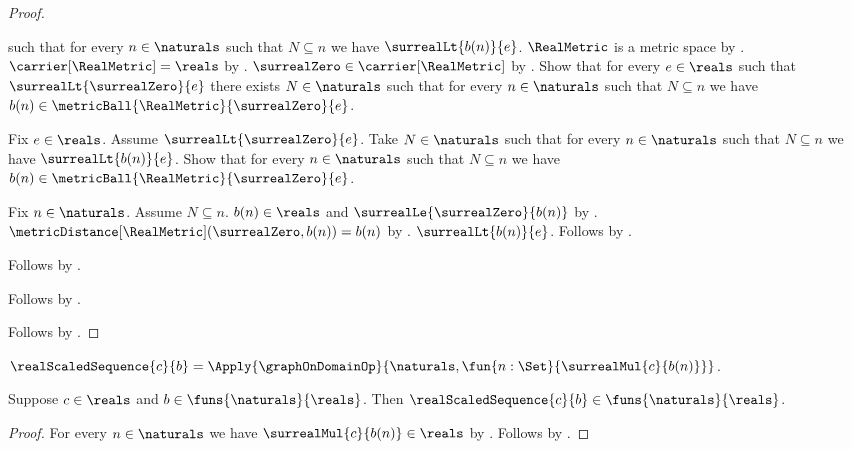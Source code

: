 \begin{proof}
\begin{subproof}
            such that for every $n\in\naturals$ such that $N\subseteq n$
                we have $\surrealLt{b(n)}{e}$.
        $\RealMetric$ is a metric space by .
        $\carrier[\RealMetric]=\reals$
            by .
        $\surrealZero\in\carrier[\RealMetric]$
            by .
        Show that for every $e\in\reals$ such that
            $\surrealLt{\surrealZero}{e}$ there exists $N\in\naturals$
            such that for every $n\in\naturals$ such that $N\subseteq n$
                we have $b(n)\in\metricBall{\RealMetric}{\surrealZero}{e}$.
        \begin{subproof}
            Fix $e\in\reals$.
            Assume $\surrealLt{\surrealZero}{e}$.
            Take $N\in\naturals$ such that for every $n\in\naturals$
                such that $N\subseteq n$ we have $\surrealLt{b(n)}{e}$.
            Show that for every $n\in\naturals$ such that $N\subseteq n$
                we have $b(n)\in\metricBall{\RealMetric}{\surrealZero}{e}$.
            \begin{subproof}
                Fix $n\in\naturals$.
                Assume $N\subseteq n$.
                $b(n)\in\reals$ and $\surrealLe{\surrealZero}{b(n)}$
                    by .
                $\metricDistance[\RealMetric](\surrealZero,b(n))=b(n)$
                    by
                    .
                $\surrealLt{b(n)}{e}$.
                Follows by
                    .
            \end{subproof}
            Follows by \auto.
        \end{subproof}
        Follows by .
    \end{subproof}
    Follows by \auto.
\end{proof}

\begin{definition}\label{real_scaled_sequence}
    $\realScaledSequence{c}{b}=\Apply{\graphOnDomainOp}
        {\naturals,\fun{n:\Set}{\surrealMul{c}{b(n)}}}$.
\end{definition}

\begin{proposition}\label{real_scaled_sequence_typed}
    Suppose $c\in\reals$ and $b\in\funs{\naturals}{\reals}$.
    Then $\realScaledSequence{c}{b}\in\funs{\naturals}{\reals}$.
\end{proposition}
\begin{proof}
    For every $n\in\naturals$ we have $\surrealMul{c}{b(n)}\in\reals$
        by .
    Follows by
        .
\end{proof}


